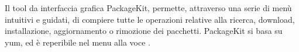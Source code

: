 Il tool da interfaccia grafica PackageKit, permette, attraverso una serie di menù intuitivi e guidati, di compiere tutte le operazioni relative alla ricerca, download, installazione, aggiornamento o rimozione dei pacchetti. 
PackageKit si basa su yum, ed è reperibile nel menu alla voce .



